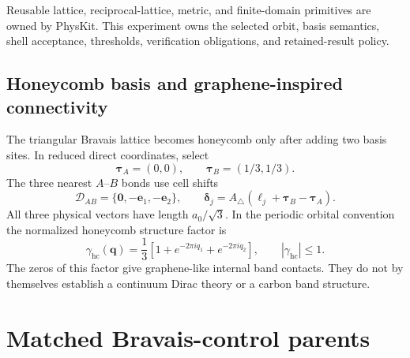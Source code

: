 \documentclass[11pt]{article}
\begin{document}
Reusable lattice, reciprocal-lattice, metric, and finite-domain primitives are owned by
PhysKit.  This experiment owns the selected orbit, basis semantics, shell acceptance,
thresholds, verification obligations, and retained-result policy.

\subsection{Honeycomb basis and graphene-inspired connectivity}

The triangular Bravais lattice becomes honeycomb only after adding two basis sites.  In
reduced direct coordinates, select
\begin{equation}
 \boldsymbol\tau_A=(0,0),
 \qquad
 \boldsymbol\tau_B=(1/3,1/3).
 \label{eq:honeycomb-basis}
\end{equation}
The three nearest $A$--$B$ bonds use cell shifts
\begin{equation}
 \mathcal D_{AB}=\{\mathbf0,-\mathbf e_1,-\mathbf e_2\},
 \qquad
 \boldsymbol\delta_j=A_{\triangle}
 (\boldsymbol\ell_j+\boldsymbol\tau_B-\boldsymbol\tau_A).
 \label{eq:honeycomb-bonds}
\end{equation}
All three physical vectors have length $a_0/\sqrt3$.  In the periodic orbital convention
the normalized honeycomb structure factor is
\begin{equation}
 \gamma_{\mathrm{hc}}(\mathbf q)
 =\frac13\left[1+e^{-2\pi iq_1}+e^{-2\pi iq_2}\right],
 \qquad |\gamma_{\mathrm{hc}}|\le1.
 \label{eq:honeycomb-structure-factor}
\end{equation}
The zeros of this factor give graphene-like internal band contacts.  They do not by
themselves establish a continuum Dirac theory or a carbon band structure.

\section{Matched Bravais-control parents}
\end{document}
